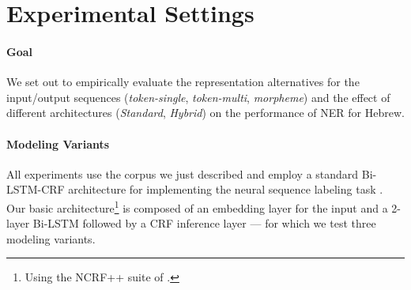\documentclass[11pt,a4paper]{article}
\newcommand{\TOKMACRO}{{\em token-single}\xspace}
\newcommand{\MULMACRO}{{\em token-multi}\xspace}
\newcommand{\MORMACRO}{{\em morpheme}\xspace}
\newcommand{\FLIPMACRO}{{\em Hybrid}\xspace}
\newcommand{\YAPMACRO}{{\em Standard}\xspace}
\begin{document}
\begin{table}[t]
\centering
{}
\caption{\label{tab:corpus-stats} 
Basic Corpus Statistics. Standard HTB Splits.}
\end{table}

\section{Experimental Settings}
\paragraph{Goal}
We set out to empirically evaluate the representation alternatives for the input/output sequences (\TOKMACRO, \MULMACRO, \MORMACRO)  and the effect of  different    architectures (\YAPMACRO,  \FLIPMACRO) on  the  performance  of  NER  for  Hebrew.

\paragraph{Modeling Variants}
All experiments  use the corpus we just described  and employ a standard Bi-LSTM-CRF  architecture  for implementing the  neural sequence labeling task \cite{DBLP:journals/corr/HuangXY15}.
Our basic architecture\footnote{Using the NCRF++ suite of    \citet{yang2018ncrf}.} is composed of an embedding layer for the input 
and a 2-layer Bi-LSTM followed by a CRF inference layer --- for which we test three modeling variants. 
\end{document}
